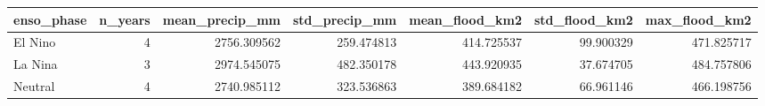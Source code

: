 \begin{tabular}{lrrrrrr}
\toprule
enso\_phase & n\_years & mean\_precip\_mm & std\_precip\_mm & mean\_flood\_km2 & std\_flood\_km2 & max\_flood\_km2 \\
\midrule
El Nino & 4 & 2756.309562 & 259.474813 & 414.725537 & 99.900329 & 471.825717 \\
La Nina & 3 & 2974.545075 & 482.350178 & 443.920935 & 37.674705 & 484.757806 \\
Neutral & 4 & 2740.985112 & 323.536863 & 389.684182 & 66.961146 & 466.198756 \\
\bottomrule
\end{tabular}
